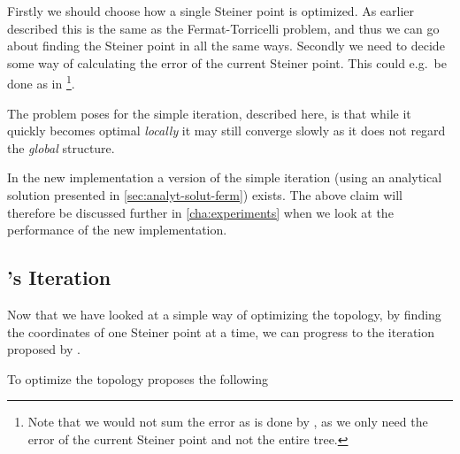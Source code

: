 Firstly we should choose how a single Steiner point is optimized. As earlier
described this is the same as the Fermat-Torricelli problem, and thus we can go
about finding the Steiner point in all the same ways. Secondly we need to
decide some way of calculating the error of the current Steiner point. This
could e.g.\ be done as in \textcite{smith1992}\footnote{Note that we would
  not sum the error as is done by \citeauthor{smith1992}, as we only need
  the error of the current Steiner point and not the entire tree.}.

The problem \citeauthor{smith1992} poses for the simple iteration, described
here, is that while it quickly becomes optimal \textit{locally} it may still
converge slowly as it does not regard the \textit{global} structure.

In the new implementation a version of the simple iteration (using an analytical
solution presented in \cref{sec:analyt-solut-ferm}) exists. The above claim will
therefore be discussed further in \cref{cha:experiments} when we look at the
performance of the new implementation.

\subsection{\citeauthor{smith1992}'s Iteration}
\label{sec:smiths-iteration}

Now that we have looked at a simple way of optimizing the topology, by finding
the coordinates of one Steiner point at a time, we can progress to the iteration
proposed by \textcite{smith1992}.

To optimize the topology \citeauthor{smith1992} proposes the following

